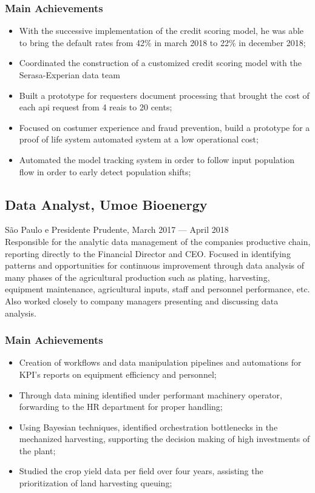 \documentclass{article}
\newcommand{\jobdate}[3]{
\large
\vspace{0.05em} 
  {#1, #2 --- #3}
\vspace{0.5em} 
\\
}
\begin{document}
{\begin{itemize}
\subsubsection{Main Achievements}

\begin{itemize}

\item{With the successive implementation of the credit scoring model, he was able to bring the default rates from 42\% in march 2018 to 22\% in december 2018;}
\item{Coordinated the construction of a customized credit scoring model with the Serasa-Experian data team}
\item{Built a prototype for requesters document processing that brought the cost of each api request from 4 reais to 20 cents;}
\item{Focused on costumer experience and fraud prevention, build a prototype for a proof of life system automated system at a low operational cost;}
\item{Automated the model tracking system in order to follow input population flow in order to early detect population shifts;}
\end{itemize}

\subsection{Data Analyst, Umoe Bioenergy}
\jobdate{São Paulo e Presidente Prudente}{March 2017}{April 2018}
Responsible for the analytic data management of the companies productive chain, reporting directly to the Financial Director and CEO. Focused in identifying patterns and opportunities for continuous improvement through data analysis of many phases of the agricultural production such as plating, harvesting, equipment maintenance, agricultural inputs, staff and personnel performance, etc. Also worked closely to company managers presenting and discussing data analysis.


\subsubsection{Main Achievements}

\begin{itemize}

\item{Creation of workflows and data manipulation pipelines and automations for KPI's reports on equipment efficiency and personnel;}
\item{Through data mining identified under performant machinery operator, forwarding to the HR department for proper handling;}
\item{Using Bayesian techniques, identified orchestration bottlenecks in the mechanized harvesting, supporting the decision making of high investments of the plant;}
\item{Studied the crop yield data per field over four years, assisting the prioritization of land harvesting queuing;}


\end{itemize}
\end{itemize}}
\end{document}
